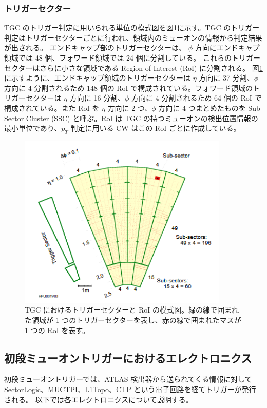 \subsubsection{トリガーセクター}
TGC のトリガー判定に用いられる単位の模式図を図\ref{fig:RoI}に示す。TGC のトリガー判定はトリガーセクターごとに行われ、領域内のミューオンの情報から判定結果が出される。
エンドキャップ部のトリガーセクターは、 $\phi$ 方向にエンドキャプ領域では 48 個、フォワード領域では 24 個に分割している。
これらのトリガーセクターはさらに小さな領域である Region of Interest (RoI) に分割される。
図\ref{fig:RoI} に示すように、エンドキャップ領域のトリガーセクターは $\eta$ 方向に 37 分割、$\phi$ 方向に 4 分割されるため 148 個の RoI で構成されている。フォワード領域のトリガーセクターは $\eta$ 方向に 16 分割、$\phi$ 方向に 4 分割されるため 64 個の RoI で構成されている。また RoI を $\eta$ 方向に 2 つ、$\phi$ 方向に 4 つまとめたものを Sub Sector Cluster (SSC) と呼ぶ。RoI は TGC の持つミューオンの検出位置情報の最小単位であり、$p_T$ 判定に用いる CW はこの RoI ごとに作成している。

\begin{figure}[tb]
  \centering
  \includegraphics[clip, width=10cm]{fig/3/RoI.png}
  \caption{TGC におけるトリガーセクターと RoI の模式図。緑の線で囲まれた領域が 1 つのトリガーセクターを表し、赤の線で囲まれたマスが 1 つの RoI を表す。}
  \label{fig:RoI}
\end{figure}

\subsection{初段ミューオントリガーにおけるエレクトロニクス}
初段ミューオントリガーでは、ATLAS 検出器から送られてくる情報に対して SectorLogic、MUCTPI、L1Topo、CTP という電子回路を経てトリガーが発行される。
以下では各エレクトロニクスについて説明する。

